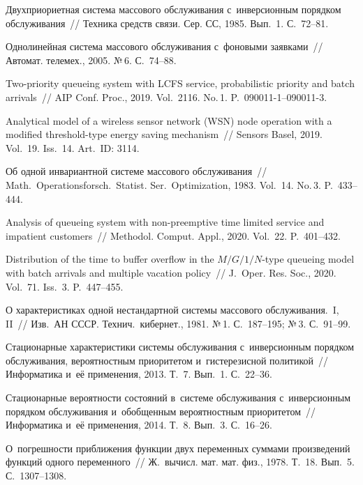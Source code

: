 \begin{multicols}{2}
{{\begin{thebibliography}{99}
 Двухприориетная система массового 
обслуживания с~инверсионным порядком обслуживания~// 
Техника средств связи. Сер. СС, 1985. Вып.~1. С.~72--81.

Однолинейная система массового обслуживания с~фоновыми заявками~// 
Автомат. телемех., 2005. №\,6. С.~74--88.

 Two-priority queueing system with LCFS
service, probabilistic priority and batch arrivals~// 
AIP Conf. Proc., 2019. Vol.~2116. No.\,1. 
P.~090011-1--\mbox{090011-3.}

 Analytical model of a wireless sensor 
network (WSN) node operation with a modified threshold-type 
energy saving mechanism~//
Sensors Basel, 2019. Vol.~19. Iss.~14. Art.\ ID: 3114.

 Об одной
инвариантной системе массового обслуживания~//
Math.\ Operationsforsch.\ Statist.
Ser.\ Optimization, 1983. Vol.~14. No.\,3. P.~433--444.

Analysis of queueing system with non-preemptive 
time limited service and impatient customers~// 
Methodol. Comput. \mbox{Appl.,} 2020. Vol.~22. P.~401--432.

Distribution of the time to buffer overflow in the ${M/G/1/N}$-type queueing 
model with batch arrivals and multiple vacation policy~//
J.~Oper. Res. Soc., 2020. Vol.~71. Iss.~3. P.~447--455.

О характеристиках одной нестандартной системы массового обслуживания.~I, II~//
Изв.\ АН СССР. Технич.\ кибернет., 1981. №\,1. С.~187--195; №\,3. С.~91--99.

Стационарные характеристики системы обслуживания с~инверсионным порядком 
обслуживания, вероятностным приоритетом и~гистерезисной политикой~//
Информатика и~её применения, 2013. Т.~7. Вып.~1. С.~22--36.

Стационарные вероятности состояний в~системе обслуживания с~инверсионным 
порядком обслуживания и~обобщенным вероятностным приоритетом~// Информатика 
и~её применения, 2014. Т.~8. Вып.~3. С.~16--26.

О~погрешности приближения функции двух переменных суммами
произведений функций одного переменного~//
Ж.~вычисл. мат. мат. физ., 1978. Т.~18. Вып.~5. С.~1307--1308.


\end{thebibliography}}}
\end{multicols}
